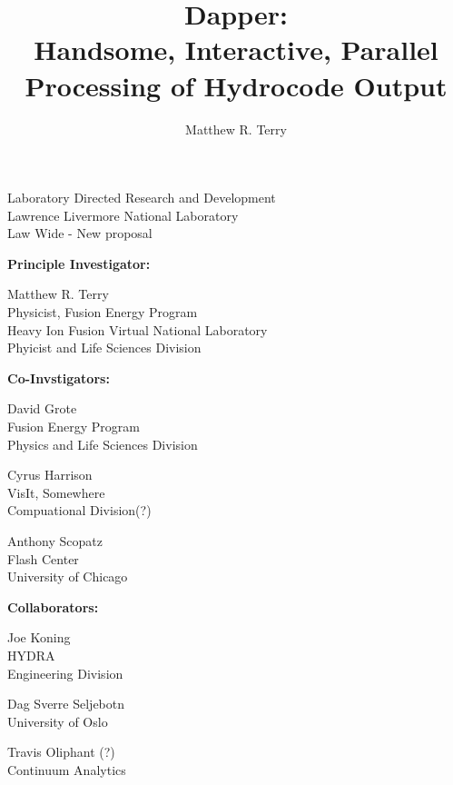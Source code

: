 \documentclass[a4paper]{article}
\title{Dapper:\\Handsome, Interactive, Parallel Processing of Hydrocode Output}
\author{Matthew R. Terry}
\date{}
\begin{document}
\maketitle

\setlength{\parindent}{0pt}
\large
Laboratory Directed Research and Development \\
Lawrence Livermore National Laboratory \\
Law Wide - New proposal

\normalsize
\setlength{\parindent}{0pt}

\begin{multicols}{2}
\setlength{\parindent}{0pt}
\textbf{Principle Investigator:}
\columnbreak

Matthew R. Terry \\
Physicist, Fusion Energy Program \\
Heavy Ion Fusion Virtual National Laboratory \\
Phyicist and Life Sciences Division

\end{multicols}


\textbf{Co-Invstigators:}
\begin{multicols}{3}
	\setlength{\parindent}{0pt}
	David Grote \\
	Fusion Energy Program \\
	Physics and Life Sciences Division\\
	\columnbreak
			
	Cyrus Harrison \\
	VisIt, Somewhere \\
	Compuational Division(?) \\
	\columnbreak

	Anthony Scopatz \\
	Flash Center \\
	University of Chicago \\
\end{multicols}

\textbf{Collaborators:}
\begin{multicols}{3}
	\setlength{\parindent}{0pt}
	Joe Koning \\
	HYDRA \\
	Engineering Division \\
	\columnbreak

	Dag Sverre Seljebotn \\
	University of Oslo \\
	\columnbreak

	Travis Oliphant (?) \\
	Continuum Analytics \\
\end{multicols}
\end{document}
